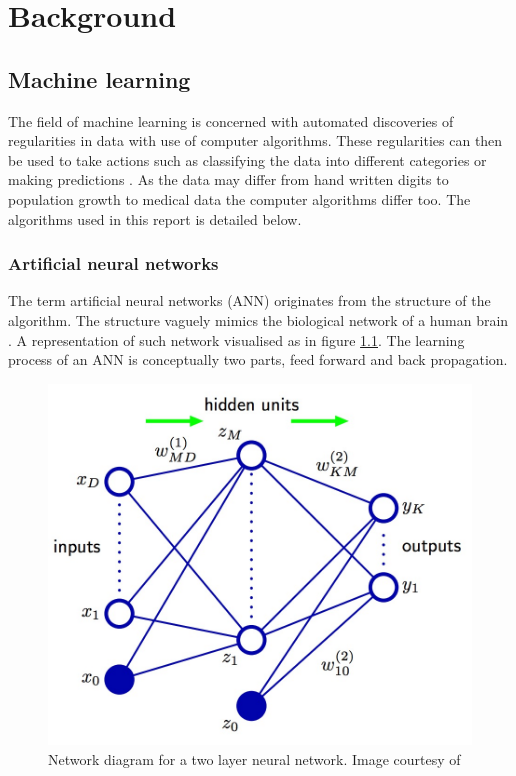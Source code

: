 \chapter{Background}


\section{Machine learning}

The field of machine learning is concerned with automated discoveries of regularities in data with use of computer algorithms. These regularities can then be used to take actions such as classifying the data into different categories or making predictions \parencite{Bishop:2006}. As the data may differ from hand written digits to population growth to medical data the computer algorithms differ too. The algorithms used in this report is detailed below.

\subsection{Artificial neural networks}

The term artificial neural networks (ANN) originates from the structure of the algorithm. The structure vaguely mimics the biological network of a human brain \parencite{Bishop:2006}. A representation of such network visualised as in figure \ref{fig:ANN_representation}. The learning process of an ANN is conceptually two parts, feed forward and back propagation.

\begin{figure}[ht!]
  \centering
  \includegraphics[width=0.7\linewidth]{images/ANN_representation.jpg}
  \caption{Network diagram for a two layer neural network. Image courtesy of \textcite{Bishop:2006}}
  \label{fig:ANN_representation}
\end{figure}

